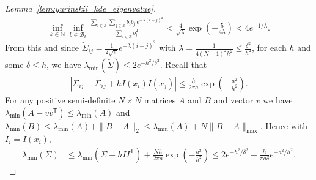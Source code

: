 \documentclass[11pt,lof]{puthesis}
\newcommand{\N}{\ensuremath{\mathbb{N}}}
\newcommand{\Z}{\ensuremath{\mathbb{Z}}}
\newcommand{\cB}{\ensuremath{\mathcal{B}}}
\newcommand{\T}{\ensuremath{\mathsf{T}}}
\theoremstyle{break}
\theoremstyle{proof}
\newtheorem{proof}{Proof}
\begin{document}
\begin{proof}[Lemma~\ref{lem:yurinskii_kde_eigenvalue}]
  \begin{align*}
    \inf_{k \in \N}
    \inf_{b \in \cB_k}
    \frac{\sum_{i \in \Z} \sum_{j \in \Z} b_i b_j \, e^{-\lambda(i-j)^2}}
    {\sum_{i \in \Z} b_i^2}
    < \frac{4}{\sqrt \lambda}
    \exp \left( - \frac{5}{4 \lambda} \right)
    < 4 e^{-1/\lambda}.
  \end{align*}
  From this and since
  $\tilde\Sigma_{i j} = \frac{1}{2 \sqrt \pi} e^{-\lambda(i-j)^2}$
  with $\lambda = \frac{1}{4(N-1)^2 h^2} \leq \frac{\delta^2}{h^2}$,
  for each $h$ and some $\delta \leq h$,
  we have $\lambda_{\min}(\tilde\Sigma) \leq 2 e^{-h^2/\delta^2}$.
  Recall that
  \begin{align*}
    \left|
      \Sigma_{i j}
      - \tilde\Sigma_{i j}
      + h I(x_i) I(x_j)
    \right|
    \leq
    \frac{h}{2 \pi a}
    \exp \left(- \frac{a^2}{h^2}\right).
  \end{align*}
  For any positive semi-definite $N \times N$ matrices $A$ and $B$
  and vector $v$ we have $\lambda_{\min}(A - v v^\T) \leq \lambda_{\min}(A)$
  and $\lambda_{\min}(B) \leq \lambda_{\min}(A) + \|B-A\|_2
  \leq \lambda_{\min}(A) + N \|B-A\|_{\max}$.
  Hence with $I_i = I(x_i)$,
  \begin{align*}
    \lambda_{\min}(\Sigma)
    &\leq
    \lambda_{\min}(\tilde\Sigma - h I I^\T)
    + \frac{N h}{2 \pi a}
    \exp \left(- \frac{a^2}{h^2}\right)
    \leq
    2 e^{-h^2/\delta^2}
    + \frac{h}{\pi a \delta}
    e^{-a^2 / h^2}.
  \end{align*}
\end{proof}
\end{document}

